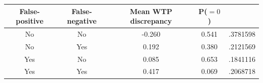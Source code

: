\begin{table}[H]\centering \begin{tabular}{cccc} \hline \hline
\textbf{False-positive}&\textbf{False-negative}&\textbf{Mean WTP discrepancy}& \textbf{P($=0$)}\\ \hline
No&No&-0.260&0.541&.3781598\\
No&Yes&0.192&0.380&.2121569\\
Yes&No&0.085&0.653&.1841116\\
Yes&Yes&0.417&0.069&.2068718\\
\hline \end{tabular} \end{table}
